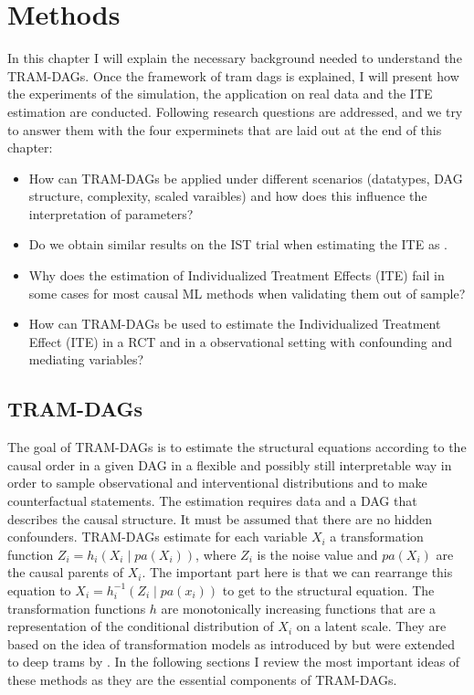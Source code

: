 



\chapter{Methods} 

In this chapter I will explain the necessary background needed to understand the TRAM-DAGs. Once the framework of tram dags is explained, I will present how the experiments of the simulation, the application on real data and the ITE estimation are conducted. Following research questions are addressed, and we try to answer them with the four experminets that are laid out at the end of this chapter:

\begin{itemize}

\item How can TRAM-DAGs be applied under different scenarios (datatypes, DAG structure, complexity, scaled varaibles) and how does this influence the interpretation of parameters?
\item Do we obtain similar results on the IST trial when estimating the ITE as \citet{chen2025}.
\item Why does the estimation of Individualized Treatment Effects (ITE) fail in some cases for most causal ML methods when validating them out of sample? 
\item How can TRAM-DAGs be used to estimate the Individualized Treatment Effect (ITE) in a RCT and in a observational setting with confounding and mediating variables?

\end{itemize}

\section{TRAM-DAGs}

The goal of TRAM-DAGs is to estimate the structural equations according to the causal order in a given DAG in a flexible and possibly still interpretable way in order to sample observational and interventional distributions and to make counterfactual statements. The estimation requires data and a DAG that describes the causal structure. It must be assumed that there are no hidden confounders. TRAM-DAGs estimate for each variable $X_i$ a transformation function $Z_i = h_i(X_i \mid pa(X_i))$, where $Z_i$ is the noise value and $pa(X_i)$ are the causal parents of $X_i$. The important part here is that we can rearrange this equation to $X_i = h_i^{-1}(Z_i \mid pa(x_i))$ to get to the structural equation. The transformation functions $h$ are monotonically increasing functions that are a representation of the conditional distribution of $X_i$ on a latent scale. They are based on the idea of transformation models as introduced by \citet{hothorn2014} but were extended to deep trams by \citet{sick2020}. In the following sections I review the most important ideas of these methods as they are the essential components of TRAM-DAGs.

